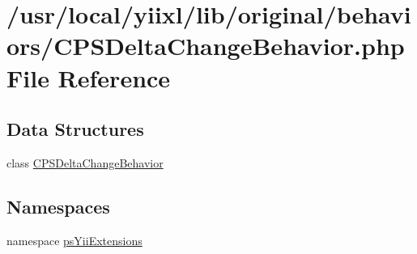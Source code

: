 \hypertarget{CPSDeltaChangeBehavior_8php}{
\section{/usr/local/yiixl/lib/original/behaviors/CPSDeltaChangeBehavior.php File Reference}
\label{CPSDeltaChangeBehavior_8php}
}
\subsection*{Data Structures}
\begin{DoxyCompactItemize}
\item 
class \hyperlink{classCPSDeltaChangeBehavior}{CPSDeltaChangeBehavior}
\end{DoxyCompactItemize}
\subsection*{Namespaces}
\begin{DoxyCompactItemize}
\item 
namespace \hyperlink{namespacepsYiiExtensions}{psYiiExtensions}
\end{DoxyCompactItemize}
